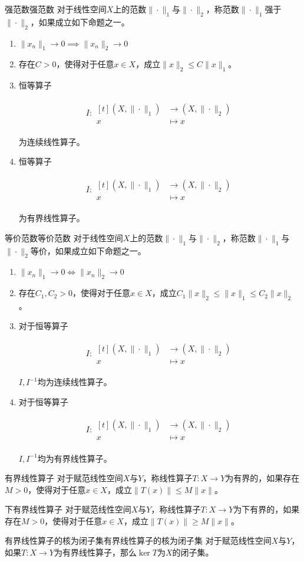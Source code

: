 \documentclass[lang = cn, scheme = chinese, thmcnt = section]{elegantbook}
\newcommand{\function}[5]{
	\begin{align*}
		#1:\begin{aligned}[t]
			#2 &\longrightarrow #3\\
			#4 &\longmapsto #5
		\end{aligned}
	\end{align*}
}                                     %
\begin{document}
\begin{definition}{强范数}{强范数}
	对于线性空间$X$上的范数$\|\cdot\|_1$与$\|\cdot\|_2$，称范数$\|\cdot\|_1$强于$\|\cdot\|_2$，如果成立如下命题之一。
	\begin{enumerate}
		\item $\|x_n\|_1\to 0\implies \|x_n\|_2\to 0$
		\item 存在$C>0$，使得对于任意$x\in X$，成立$\|x\|_2\le C\|x\|_1$。
		\item 恒等算子
		\function{I}{(X,\|\cdot\|_1)}{(X,\|\cdot\|_2)}{x}{x}
		为连续线性算子。
		\item 恒等算子
		\function{I}{(X,\|\cdot\|_1)}{(X,\|\cdot\|_2)}{x}{x}
		为有界线性算子。
	\end{enumerate}
\end{definition}

\begin{definition}{等价范数}{等价范数}
	对于线性空间$X$上的范数$\|\cdot\|_1$与$\|\cdot\|_2$，称范数$\|\cdot\|_1$与$\|\cdot\|_2$等价，如果成立如下命题之一。
	\begin{enumerate}
		\item $\|x_n\|_1\to 0\iff\|x_n\|_2\to 0$
		\item 存在$C_1,C_2>0$，使得对于任意$x\in X$，成立$C_1\|x\|_2\le \|x\|_1 \le C_2\|x\|_2$。
		\item 对于恒等算子
		\function{I}{(X,\|\cdot\|_1)}{(X,\|\cdot\|_2)}{x}{x}
		$I,I^{-1}$均为连续线性算子。
		\item 对于恒等算子
		\function{I}{(X,\|\cdot\|_1)}{(X,\|\cdot\|_2)}{x}{x}
		$I,I^{-1}$均为有界线性算子。
	\end{enumerate}
\end{definition}

\begin{definition}{有界线性算子}
	对于赋范线性空间$X$与$Y$，称线性算子$T:X\to Y$为有界的，如果存在$M>0$，使得对于任意$x\in X$，成立$\|T(x)\|\le M\|x\|$。
\end{definition}

\begin{definition}{下有界线性算子}
	对于赋范线性空间$X$与$Y$，称线性算子$T:X\to Y$为下有界的，如果存在$M>0$，使得对于任意$x\in X$，成立$\|T(x)\|\ge M\|x\|$。
\end{definition}

\begin{proposition}{有界线性算子的核为闭子集}{有界线性算子的核为闭子集}
	对于赋范线性空间$X$与$Y$，如果$T:X\to Y$为有界线性算子，那么$\ker T$为$X$的闭子集。
\end{proposition}
\end{document}
